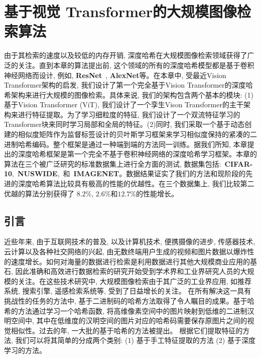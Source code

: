 \chapter{基于视觉 Transformer的大规模图像检索算法}
由于其检索的速度以及较低的内存开销, 深度哈希在大规模图像检索领域获得了广泛的关注。直到本章的算法提出前, 这个领域的所有的深度哈希模型都是基于卷积神经网络而设计, 例如, \textbf{ResNet}~\cite{he2016deep}, \textbf{AlexNet}等。在本章中, 受最近Vision Transformer架构的启发, 我们设计了第一个完全基于Vision Transformer的深度哈希架构来进行大规模的图像检索。具体来说, 我们的架构包含两个基本的模块: (1) 基于Vision Transformer (ViT), 我们设计了一个孪生Vison Transformer的主干架构来进行特征提取。为了学习细粒度的特征, 我们设计了一个双流特征学习的Transformer块来同时学习局部和全局的特征。(2)同时, 我们采取一个基于动态创建的相似度矩阵作为监督标签设计的贝叶斯学习框架来学习相似度保持的紧凑的二进制哈希编码。整个框架是通过一种端到端的方法同一训练。据我们所知, 本章提出的深度哈希框架是第一个完全不基于卷积神经网络的深度哈希学习框架。本章的算法在三个被广泛研究的标准数据集上进行全方面的测试, 数据集包括:~\textbf{CIFAR-10},~\textbf{NUSWIDE},~和~\textbf{IMAGENET}。数据结果证实了我们的方法和现阶段的先进的深度哈希算法比较具有极高的性能的优越性。在三个数据集上, 我们比较第二优越的算法分别获得了 $8.2\%$, $2.6 \%$和$12.7\%$的性能增长。

\section{引言}
近些年来, 由于互联网技术的普及, 以及计算机技术, 便携摄像的进步, 传感器技术, 云计算以及各种社交网络的兴起, 由无数终端用户生成的视频和图片数据以爆炸性的速度增长。如何对海量的数据进行检索是利用数据进行其他大规模商业应用的基石, 因此准确和高效进行数据检索的研究开始受到学术界和工业界研究人员的大规模的关注。在这些技术研究中, 大规模图像检索由于其广泛的工业界应用, 如推荐系统, 搜索引擎, 遥感检索系统等, 受到了日益增长的关注。 在所有解决这一具有挑战性的任务的方法中\cite{fu2017fast, ge2013optimized, jegou2010product, malkov2018efficient}, 基于二进制码的哈希方法取得了令人瞩目的成果。基于哈希的方法通过学习一个哈希函数, 将高维像素空间中的图片映射到低维的二进制汉明空间中, 其中在低维度的汉明空间的图片对应的哈希码需要保存原图片之间的视觉相似性。过去的年, 一大批的基于哈希的方法被提出。 根据它们提取特征的方法, 我们可以将其简单的分成两个类别: (1) 基于手工特征提取的方法 (2) 基于深度学习的方法。\par


